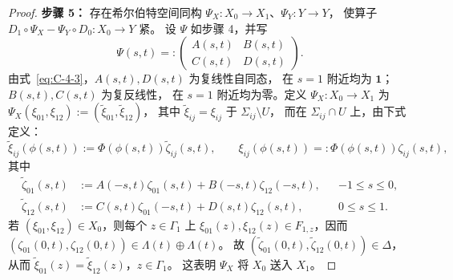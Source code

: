 \begin{proof}
\noindent\textbf{步骤 5：} 存在希尔伯特空间同构
$\Psi_X:X_0\to X_1$、$\Psi_Y:Y\to Y$，
使算子 $D_1\circ\Psi_X-\Psi_Y\circ D_0:X_0\to Y$ 紧。
设 $\Psi$ 如步骤 4，并写
\[
  \Psi(s,t)=:
  \begin{pmatrix}A(s,t)&B(s,t)\\C(s,t)&D(s,t)\end{pmatrix}.
\]
由式~\eqref{eq:C-4-3}，$A(s,t),D(s,t)$ 为复线性自同态，
在 $s=1$ 附近均为 $\mathbf1$；$B(s,t),C(s,t)$ 为复反线性，
在 $s=1$ 附近均为零。定义 $\Psi_X:X_0\to X_1$ 为
$\Psi_X(\xi_{01},\xi_{12}):=(\widetilde\xi_{01},\widetilde\xi_{12})$，
其中 $\widetilde\xi_{ij}=\xi_{ij}$ 于 $\Sigma_{ij}\setminus U$，
而在 $\Sigma_{ij}\cap U$ 上，由下式定义：
\begin{equation}\label{eq:C-4-5}
  \widetilde\xi_{ij}(\phi(s,t))
  :=\Phi(\phi(s,t))\widetilde\zeta_{ij}(s,t),\qquad
  \xi_{ij}(\phi(s,t))=:\Phi(\phi(s,t))\zeta_{ij}(s,t),
\end{equation}
其中
\begin{equation}\label{eq:C-4-6}
\begin{aligned}
  \widetilde\zeta_{01}(s,t)
    &:=A(-s,t)\zeta_{01}(s,t)+B(-s,t)\zeta_{12}(-s,t),
      &&-1\le s\le0,\\
  \widetilde\zeta_{12}(s,t)
    &:=C(s,t)\zeta_{01}(-s,t)+D(s,t)\zeta_{12}(s,t),
      &&0\le s\le1.
\end{aligned}
\end{equation}
若 $(\xi_{01},\xi_{12})\in X_0$，则每个 $z\in\Gamma_1$ 上
$\xi_{01}(z),\xi_{12}(z)\in F_{1,z}$，因而
$(\zeta_{01}(0,t),\zeta_{12}(0,t))\in\Lambda(t)\oplus\Lambda(t)$。
故 $(\widetilde\zeta_{01}(0,t),\widetilde\zeta_{12}(0,t))\in\Delta$，
从而 $\widetilde\xi_{01}(z)=\widetilde\xi_{12}(z)$，$z\in\Gamma_1$。
这表明 $\Psi_X$ 将 $X_0$ 送入 $X_1$。


\end{proof}
